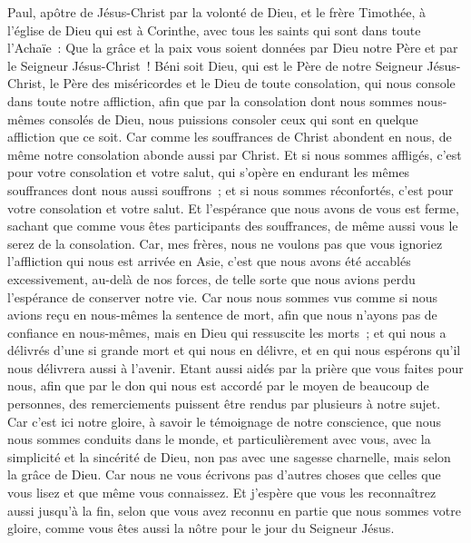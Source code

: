 \begin{multicols}{2}
\VerseOne{}Paul, apôtre de Jésus-Christ par la volonté de Dieu, et le frère Timothée, à l'église de Dieu qui est à Corinthe, avec tous les saints qui sont dans toute l'Achaïe~:
Que la grâce et la paix vous soient données par Dieu notre Père et par le Seigneur Jésus-Christ~!
Béni soit Dieu, qui est le Père de notre Seigneur Jésus-Christ, le Père des miséricordes et le Dieu de toute consolation,
qui nous console dans toute notre affliction, afin que par la consolation dont nous sommes nous-mêmes consolés de Dieu, nous puissions consoler ceux qui sont en quelque affliction que ce soit.
Car comme les souffrances de Christ abondent en nous, de même notre consolation abonde aussi par Christ.
Et si nous sommes affligés, c'est pour votre consolation et votre salut, qui s'opère en endurant les mêmes souffrances dont nous aussi souffrons~; et si nous sommes réconfortés, c'est pour votre consolation et votre salut.
Et l'espérance que nous avons de vous est ferme, sachant que comme vous êtes participants des souffrances, de même aussi vous le serez de la consolation.
Car, mes frères, nous ne voulons pas que vous ignoriez l'affliction qui nous est arrivée en Asie, c'est que nous avons été accablés excessivement, au-delà de nos forces, de telle sorte que nous avions perdu l'espérance de conserver notre vie.
Car nous nous sommes vus comme si nous avions reçu en nous-mêmes la sentence de mort, afin que nous n'ayons pas de confiance en nous-mêmes, mais en Dieu qui ressuscite les morts~;
et qui nous a délivrés d'une si grande mort et qui nous en délivre, et en qui nous espérons qu'il nous délivrera aussi à l'avenir.
Etant aussi aidés par la prière que vous faites pour nous, afin que par le don qui nous est accordé par le moyen de beaucoup de personnes, des remerciements puissent être rendus par plusieurs à notre sujet.
Car c'est ici notre gloire, à savoir le témoignage de notre conscience, que nous nous sommes conduits dans le monde, et particulièrement avec vous, avec la simplicité et la sincérité de Dieu, non pas avec une sagesse charnelle, mais selon la grâce de Dieu.
Car nous ne vous écrivons pas d'autres choses que celles que vous lisez et que même vous connaissez. Et j'espère que vous les reconnaîtrez aussi jusqu'à la fin,
selon que vous avez reconnu en partie que nous sommes votre gloire, comme vous êtes aussi la nôtre pour le jour du Seigneur Jésus.

\end{multicols}
